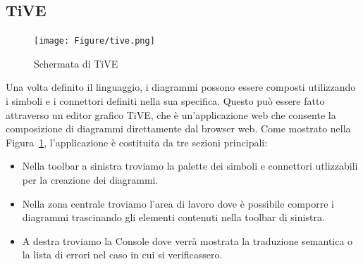         \subsection{TiVE}

            \begin{figure}[htbp]
                \centering
                \texttt{[image: Figure/tive.png]}
                \caption{Schermata di TiVE}
                \label{fig:tive}
            \end{figure}

            Una volta definito il linguaggio, i diagrammi possono essere composti utilizzando i simboli e i connettori definiti nella sua specifica. Questo può essere fatto attraverso un editor grafico TiVE, che è un'applicazione web che consente la composizione di diagrammi direttamente dal browser web.
            \newline
            Come mostrato nella Figura~\ref{fig:tive}, l'applicazione è costituita da tre sezioni principali:
            \begin{itemize}
                \item Nella toolbar a sinistra troviamo la palette dei simboli e connettori utlizzabili per la creazione dei diagrammi.
                \item Nella zona centrale troviamo l'area di lavoro dove è possibile comporre i diagrammi trascinando gli elementi contenuti nella toolbar di sinistra.
                \item A destra troviamo la Console dove verrà mostrata la traduzione semantica o la lista di errori nel caso in cui si verificassero.
            \end{itemize}
